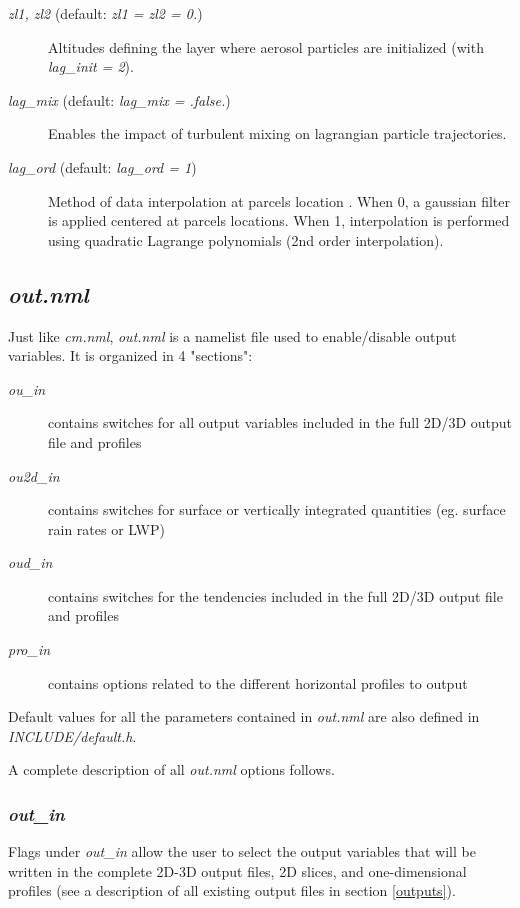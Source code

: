 \documentclass[12pt,A4,french]{article}
\begin{document}
\begin{description}
\item[{\it zl1, zl2} (default: {\it zl1 = zl2 = 0.})]

Altitudes defining the layer where aerosol particles are initialized (with {\it lag\_init = 2}).

\item[{\it lag\_mix} (default: {\it lag\_mix = .false.})]

Enables the impact of turbulent mixing on lagrangian particle trajectories.

\item[{\it lag\_ord} (default: {\it lag\_ord = 1})]

Method of data interpolation at parcels location . When 0, a gaussian filter is applied centered at parcels locations. When 1, interpolation is performed using quadratic Lagrange polynomials (2nd order interpolation). 

\end{description}

\subsection{{\it out.nml}}

Just like {\it cm.nml}, {\it out.nml} is a namelist file used to enable/disable output variables. It is organized in 4 "sections":
\begin{description}
\item[{\it ou\_in}] contains switches for all output variables included in the full 2D/3D output file and profiles
\item[{\it ou2d\_in}] contains switches for surface or vertically integrated quantities (eg. surface rain rates or LWP)
\item[{\it oud\_in}] contains switches for the tendencies included in the full 2D/3D output file and profiles
\item[{\it pro\_in}] contains options related to the different horizontal profiles to output
\end{description}
Default values for all the parameters contained in {\it out.nml} are also defined in {\it INCLUDE/default.h}. 

A complete description of all {\it out.nml} options follows.

\subsubsection{{\it out\_in}}

Flags under {\it out\_in} allow the user to select the output variables that will be written in the complete 2D-3D output files, 2D slices, and one-dimensional profiles (see a description of all existing output files in section \ref{outputs}).
\end{document}
